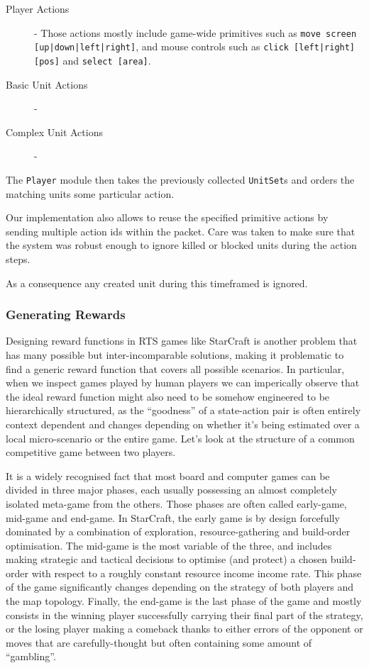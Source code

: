\begin{description}
\item [Player Actions] - Those actions mostly include game-wide primitives such
  as \texttt{move screen [up|down|left|right]}, and mouse controls such as
  \texttt{click [left|right][pos]} and \texttt{select [area]}.
\item [Basic Unit Actions] -
\item [Complex Unit Actions] - 
\end{description}

The \texttt{Player} module then takes the previously collected \texttt{UnitSet}s
and orders the matching units some particular action.

Our implementation also allows to reuse the specified primitive actions by sending
multiple action ids within the packet. 
Care was taken to make sure that the system was robust enough to ignore killed
or blocked units during the action steps.

As a consequence any created unit during this timeframed is ignored.

\subsubsection{Generating Rewards}

Designing reward functions in RTS games like StarCraft is another problem that
has many possible but inter-incomparable solutions, making it problematic to
find a generic reward function that covers all possible scenarios. In
particular, when we inspect games played by human players we can imperically
observe that the ideal reward function might also need to be somehow engineered
to be hierarchically structured, as the ``goodness'' of a state-action pair is
often entirely context dependent and changes depending on whether it's being
estimated over a local micro-scenario or the entire game. Let's look at the
structure of a common competitive game between two players.

It is a widely recognised fact that most board and computer games can be divided
in three major phases, each usually possessing an almost completely isolated
meta-game from the others. Those phases are often called early-game, mid-game
and end-game. In StarCraft, the early game is by design forcefully dominated by
a combination of exploration, resource-gathering and build-order optimisation.
The mid-game is the most variable of the three, and includes making strategic
and tactical decisions to optimise (and protect) a chosen build-order with
respect to a roughly constant resource income income rate. This phase of the
game significantly changes depending on the strategy of both players and the map
topology. Finally, the end-game is the last phase of the game and mostly
consists in the winning player successfully carrying their final part of the
strategy, or the losing player making a comeback thanks to either errors of the
opponent or moves that are carefully-thought but often containing some amount of
``gambling''.

